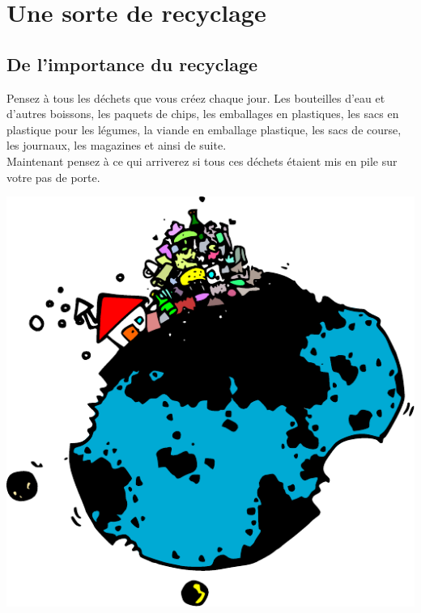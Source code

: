 



\chapter{Une sorte de recyclage}
\section{De l'importance du recyclage}
Pensez à tous les déchets que vous créez chaque jour. Les bouteilles d'eau et d'autres boissons, les paquets de chips, les emballages en plastiques, les sacs en plastique pour les légumes, la viande en emballage plastique, les sacs de course, les journaux, les magazines et ainsi de suite.\\

Maintenant pensez à ce qui arriverez si tous ces déchets étaient mis en pile sur votre pas de porte.

\begin{center}
 \includegraphics{images/recycler.pdf}
\end{center}

